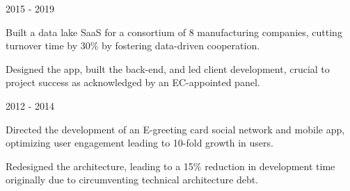 \begin{cventries}

  \cventrythin
    {} %
    {2015 - 2019} %
    {
          \begin{cvitems} %
			\item {Built a data lake SaaS for a consortium of 8 manufacturing companies, cutting turnover time by 30\% by fostering data-driven cooperation.} 
			\item {Designed the app, built the back-end, and led client development, crucial to project success as acknowledged by an EC-appointed panel.}
	      \end{cvitems}
    }
    



  \cventrythin
    {} %
    {2012 - 2014} %
    {
          \begin{cvitems} %
				\item {Directed the development of an E-greeting card social network and mobile app, optimizing user engagement leading to 10-fold growth in users.}
				\item {Redesigned the architecture, leading to a 15\% reduction in development time originally due to circumventing technical architecture debt.}
	      \end{cvitems}
    }
    

\end{cventries}
